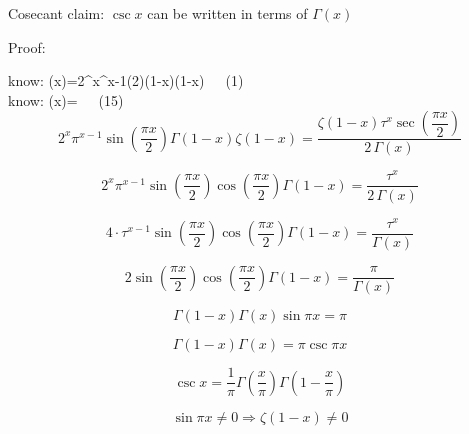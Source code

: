 \documentclass[12pt]{article}
\begin{document}
\pagebreak
\begin{section}{Cosecant}
	claim: $\csc x$ can be written in terms of $\Gamma(x)$

	\noindent Proof:

	\noindent know: \zeta(x)=2^x\pi^{x-1}\sin\left(2\right)\Gamma(1-x)\zeta(1-x)~~~(1)\\
	
	\noindent know: \zeta(x)=~~~(15)\\

	\begin{equation}
		2^x\pi^{x-1}\sin\left(\dfrac{\pi x}2\right)\Gamma(1-x)\zeta(1-x)=\dfrac{\zeta(1-x)\tau^x\sec\left(\dfrac{\pi x}2\right)}{2\,\Gamma(x)}
	\end{equation}

	\begin{equation}
		2^x\pi^{x-1}\sin\left(\dfrac{\pi x}2\right)\cos\left(\dfrac{\pi x}2\right)\Gamma(1-x)=\dfrac{\tau^x}{2\,\Gamma(x)}
	\end{equation}

	\begin{equation}
		4\cdot\tau^{x-1}\sin\left(\dfrac{\pi x}2\right)\cos\left(\dfrac{\pi x}2\right)\Gamma(1-x)=\dfrac{\tau^x}{\Gamma(x)}
	\end{equation}

	\begin{equation}
		2\sin\left(\dfrac{\pi x}2\right)\cos\left(\dfrac{\pi x}2\right)\Gamma(1-x)=\dfrac{\pi}{\Gamma(x)}
	\end{equation}

	\begin{equation}
		\Gamma(1-x)\Gamma(x)\sin\pi x=\pi
	\end{equation}

	\begin{equation}
		\Gamma(1-x)\Gamma(x)=\pi\csc\pi x
	\end{equation}

	\begin{equation}
		\csc x=\dfrac1\pi\Gamma\left(\dfrac x\pi\right)\Gamma\left(1-\dfrac x\pi\right)
	\end{equation}

	\begin{equation}
		\sin\pi x\ne0\Longrightarrow\zeta(1-x)\ne0
	\end{equation}


	\noindent\blacksquare
\end{section}
\end{document}
